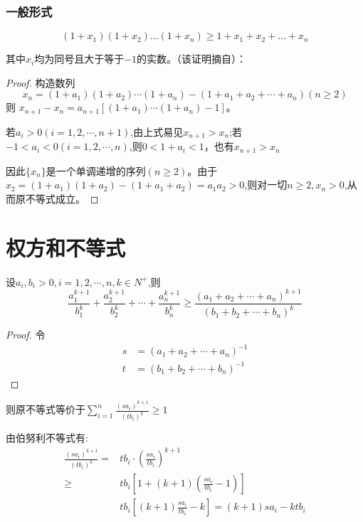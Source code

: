 \documentclass[a4paper]{article} %
\numberwithin{equation}{section} %
\begin{document}
\subsubsection{一般形式}

\begin{equation}
(1+x_1)(1+x_2)\ldots(1+x_n)\ge 1+x_1+x_2+\ldots + x_n
\end{equation}

其中$x_i$均为同号且大于等于$-1$的实数。（该证明摘自\cite{ineq}）：

\begin{proof}
构造数列
$$
x_n=(1+a_1)(1+a_2)\cdots(1+a_n)-(1+a_1+a_2+\cdots+a_n)(n\ge 2)
$$ 则
$x_{n+1}-x_n=a_{n+1}[(1+a_1)\cdots(1+a_n)-1]$。

若$a_i>0(i=1,2,\cdots,n+1)$,由上式易见$x_{n+1}> x_n$;若$-1< a_i< 0(i=1,2,\cdots,n)$,则$0< 1+a_i< 1$，也有$x_{n+1}>x_n$

因此$\{x_n\}$是一个单调递增的序列$(n\ge 2)$。由于$x_2=(1+a_1)(1+a_2)-(1+a_1+a_2)=a_1a_2>0$,则对一切$n\ge 2,x_n> 0$,从而原不等式成立。
\end{proof}

\section{权方和不等式}

设$a_i,b_i> 0,i=1,2,\cdots,n,k\in N^+$,则
\begin{equation}
\frac{a_1^{k+1}}{b_1^k}+\frac{a_2^{k+1}}{b_2^k}+\cdots+\frac{a_n^{k+1}}{b_n^k}\ge \frac{(a_1+a_2+\cdots+a_n)^{k+1}}{(b_1+b_2+\cdots+b_n)^k}
\end{equation}

\begin{proof}
令
\begin{align}
s &=(a_1+a_2+\cdots+a_n)^{-1} \\
t &=(b_1+b_2+\cdots+b_n)^{-1} 
\end{align}
\end{proof}

则原不等式等价于$\displaystyle \sum_{i=1}^n\frac{(sa_i)^{k+1}}{(tb_i)^k}\ge 1$

由伯努利不等式有:
\begin{align}
\frac{(sa_i)^{k+1}}{(tb_i)^k} 
=& tb_i\cdot\left(\frac{sa_i}{tb_i}\right)^{k+1} \\
\ge & tb_i\left[1+(k+1)(\frac{sa_i}{tb_i}-1)\right] \\
& tb_i\left[(k+1)\frac{sa_i}{tb_i}-k\right]=(k+1)sa_i-ktb_i
\end{align}
\end{document}
